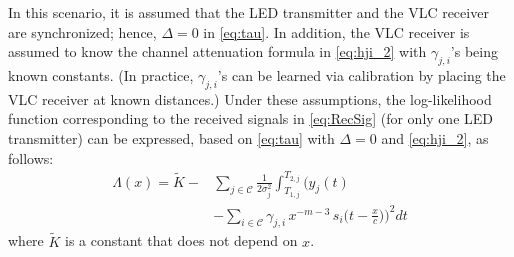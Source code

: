 \documentclass[10pt,twocolumn]{IEEEtran}
\newcommand{\mtC}{{\mathcal{C}}}
\begin{document}
In this scenario, it is assumed that the LED transmitter and the VLC receiver are synchronized; hence, $\Delta=0$ in \eqref{eq:tau}. In addition, the VLC receiver is assumed to know the channel attenuation formula in \eqref{eq:hji_2} with $\gamma_{j,i}$'s being known constants. (In practice, $\gamma_{j,i}$'s can be learned via calibration by placing the VLC receiver at known distances.) Under these assumptions, the log-likelihood function corresponding to the received signals in \eqref{eq:RecSig} (for only one LED transmitter) can be expressed, based on \eqref{eq:tau} with $\Delta=0$ and \eqref{eq:hji_2}, as follows:
\begin{align}\label{eq:loglike1}
\Lambda(x) = \tilde{K} - &\sum_{j\in\mtC}  \frac{1}{2\sigma_j^2}\int_{T_{1,j}}^{T_{2,j}}
\bigg(y_j(t)
\\\nonumber
&-\sum_{i\in\mtC}\gamma_{j,i}\,x^{-m-3}\,s_i\Big(t-\frac{x}{c}\Big)\bigg)^2dt
\end{align}
where $\tilde{K}$ is a constant that does not depend on $x$.
\end{document}
